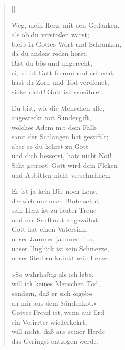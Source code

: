 \begin{multicols}{2}
\settowidth{\versewidth}{Weg, mein Herz, mit den Gedanken,}
\begin{verse}[\versewidth]

 Weg, mein Herz, mit den Gedanken,\\
als ob du verstoßen wärst;\\
bleib in Gottes Wort und Schranken,\\
da du anders reden hörst.\\
Bist du bös und ungerecht,\\
ei, so ist Gott fromm und schlecht;\\
hast du Zorn und Tod verdienet,\\
sinke nicht! Gott ist versühnet.

 Du bist, wie die Menschen alle,\\
angesteckt mit Sündengift,\\
welches Adam mit dem Falle\\
samt der Schlangen hat gestift't;\\
aber so du kehrst zu Gott\\
und dich besserst, hats nicht Not!\\
Seht getrost! Gott wird dein Flehen\\
und Abbitten nicht verschmähen.

 Er ist ja kein Bär noch Leue,\\
der sich nur nach Blute sehnt,\\
sein Herz ist zu lauter Treue\\
und zur Sanftmut angewöhnt.\\
Gott hat einen Vatersinn,\\
unser Jammer jammert ihn,\\
unser Unglück ist sein Schmerze,\\
unser Sterben kränkt sein Herze.

 »So wahrhaftig als ich lebe,\\
will ich keines Menschen Tod,\\
sondern, daß er sich ergebe\\
an mir aus dem Sündenkot.«\\
Gottes Freud ist, wenn auf Erd\\
ein Verirrter wiederkehrt;\\
will nicht, daß aus seiner Herde\\
das Geringst entzogen werde.


\end{verse}
\end{multicols}
